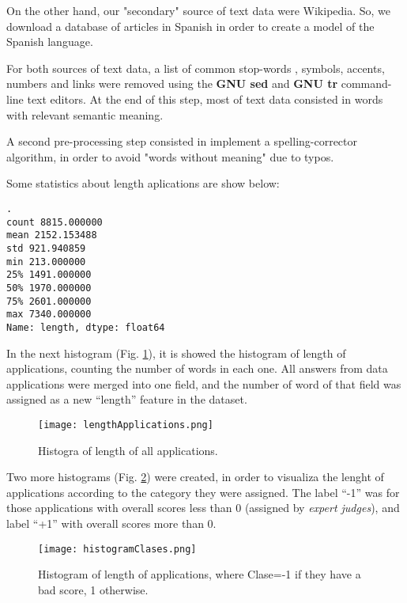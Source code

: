 On the other hand, our "secondary" source of text data were Wikipedia. So, we download a database of articles in Spanish \cite{wiki:Download} in order to create a model of the Spanish language. 

For both sources of text data, a list of common stop-words \cite{ranks:stopwords}, symbols, accents, numbers and links were removed using the \textbf{GNU sed} and \textbf{GNU tr}  command-line text editors. At the end of this step, most of text data consisted in words with relevant semantic meaning. 

A second pre-processing step consisted in implement a spelling-corrector algorithm, in order to avoid "words without meaning" due to typos.

Some statistics about length aplications are show below:

\texttt{.\\
count    8815.000000\\
mean     2152.153488\\
std       921.940859\\
min       213.000000\\
25\%      1491.000000\\
50\%      1970.000000\\
75\%      2601.000000\\
max      7340.000000\\
Name: length, dtype: float64\\}

In the next histogram (Fig. \ref{fig:allHistogram}), it is showed the histogram of length of applications, counting the number of words in each one. All answers from data applications were merged into one field, and the number of word of that field was assigned as a new ``length'' feature in the dataset. 

\begin{figure}[h]
	\label{fig:allHistogram}
	\texttt{[image: lengthApplications.png]}
    \caption{Histogra of length of all applications.}
\end{figure}

Two more histograms (Fig. \ref{fig:clasesHistogram}) were created, in order to visualiza the lenght of applications according to the category they were assigned. The label ``-1'' was for those applications with overall scores less than 0 (assigned by \textit{expert judges}), and label ``+1''  with overall scores more than 0. 

\begin{figure}[h]
	\label{fig:clasesHistogram}
	\texttt{[image: histogramClases.png]}
    \caption{Histogram of length of applications, where Clase=-1 if they have a bad score, 1 otherwise.}
\end{figure}

